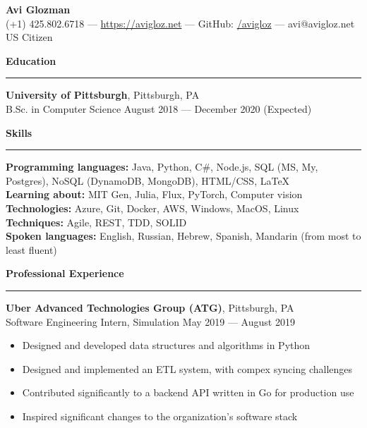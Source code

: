 \documentclass[11pt]{article}
\begin{document}
	\pagestyle{empty}
	\begin{center}
		{\LARGE \textbf{Avi Glozman}}\\
		\vspace{2mm}
		{\large (+1) 425.802.6718 --- \href{https://avigloz.net}{https://avigloz.net} --- GitHub: \href{https://github.com/avigloz}{/avigloz} --- avi@avigloz.net}\\
		\vspace{2mm}
		US Citizen
	\end{center}
	
        \begin{flushleft}

		\vspace{-1.75mm}
		{\large \raggedright \textbf{Education}}
		\vspace{1.5mm}
	
		\hrule
	
		\vspace{2.5mm}
		\textbf{University of Pittsburgh}, Pittsburgh, PA\\
		{\small B.Sc. in Computer Science \hfill August 2018 --- December 2020 (Expected)}
	
		\vspace{1.75mm}
		{\large \raggedright \textbf{Skills}}
		\vspace{1.5mm}
	
		\hrule
	
		\vspace{2.5mm}
		\textbf{Programming languages:} Java, Python, C\#, Node.js, SQL (MS, My, Postgres), NoSQL (DynamoDB, MongoDB), HTML/CSS, \LaTeX\\
		\textbf{Learning about:} MIT Gen, Julia, Flux, PyTorch, Computer vision\\
		\textbf{Technologies:} Azure, Git, Docker, AWS, Windows, MacOS, Linux\\
		\textbf{Techniques:} Agile, REST, TDD, SOLID\\
		\textbf{Spoken languages:} English, Russian, Hebrew, Spanish, Mandarin (from most to least fluent)
		
		\vspace{1.75mm}
		{\large \raggedright \textbf{Professional Experience}}
		\vspace{1.5mm}
	
		\hrule
	
		\vspace{2.5mm}
		\textbf{Uber Advanced Technologies Group (ATG)}, Pittsburgh, PA\\
		{\small Software Engineering Intern, Simulation \hfill May 2019 --- August 2019}
		\begin{itemize}
			\item Designed and developed data structures and algorithms in Python
			\item Designed and implemented an ETL system, with compex syncing challenges
			\item Contributed significantly to a backend API written in Go for production use
			\item Inspired significant changes to the organization's software stack
		\end{itemize}
	

\end{flushleft}
\end{document}
